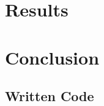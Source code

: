 \documentclass[12pt,Bold,letterpaper,TexShade]{mcgilletdclass}
\begin{document}
\chapter{Results}
\label{res}


\chapter{Conclusion}
\label{conc}



\begin{appendices}
\chapter{Written Code}
\label{code}

\end{appendices}


\end{document}
